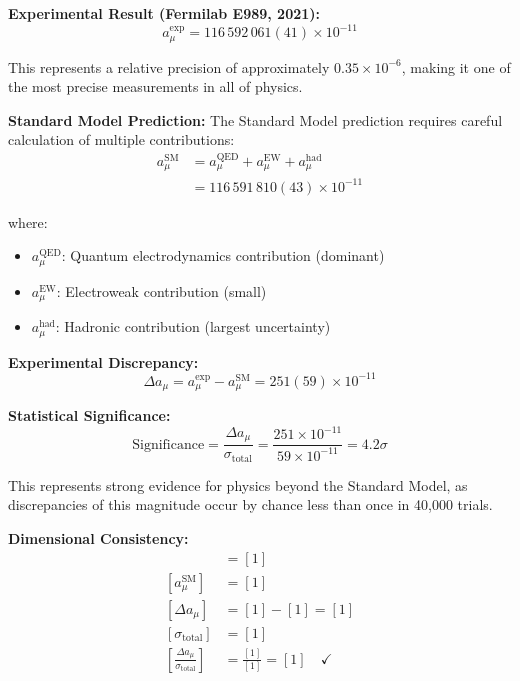 \documentclass[12pt,a4paper]{report}
\begin{document}
\textbf{Experimental Result (Fermilab E989, 2021):}
\begin{equation}
	a_\mu^{\text{exp}} = 116\,592\,061(41) \times 10^{-11}
	\label{eq:muon_experimental}
\end{equation}

This represents a relative precision of approximately $0.35 \times 10^{-6}$, making it one of the most precise measurements in all of physics.

\textbf{Standard Model Prediction:}
The Standard Model prediction requires careful calculation of multiple contributions:
\begin{align}
	a_\mu^{\text{SM}} &= a_\mu^{\text{QED}} + a_\mu^{\text{EW}} + a_\mu^{\text{had}} \\
	&= 116\,591\,810(43) \times 10^{-11}
\end{align}

where:
\begin{itemize}
	\item $a_\mu^{\text{QED}}$: Quantum electrodynamics contribution (dominant)
	\item $a_\mu^{\text{EW}}$: Electroweak contribution (small)
	\item $a_\mu^{\text{had}}$: Hadronic contribution (largest uncertainty)
\end{itemize}

\textbf{Experimental Discrepancy:}
\begin{equation}
	\Delta a_\mu = a_\mu^{\text{exp}} - a_\mu^{\text{SM}} = 251(59) \times 10^{-11}
	\label{eq:muon_discrepancy}
\end{equation}

\textbf{Statistical Significance:}
\begin{equation}
	\text{Significance} = \frac{\Delta a_\mu}{\sigma_{\text{total}}} = \frac{251 \times 10^{-11}}{59 \times 10^{-11}} = 4.2\sigma
\end{equation}

This represents strong evidence for physics beyond the Standard Model, as discrepancies of this magnitude occur by chance less than once in 40,000 trials.

\textbf{Dimensional Consistency:}
\begin{align}
	[a_\mu^{\text{exp}}] &= [1] \\
	[a_\mu^{\text{SM}}] &= [1] \\
	[\Delta a_\mu] &= [1] - [1] = [1] \\
	[\sigma_{\text{total}}] &= [1] \\
	\left[\frac{\Delta a_\mu}{\sigma_{\text{total}}}\right] &= \frac{[1]}{[1]} = [1] \quad \checkmark
\end{align}
\end{document}
